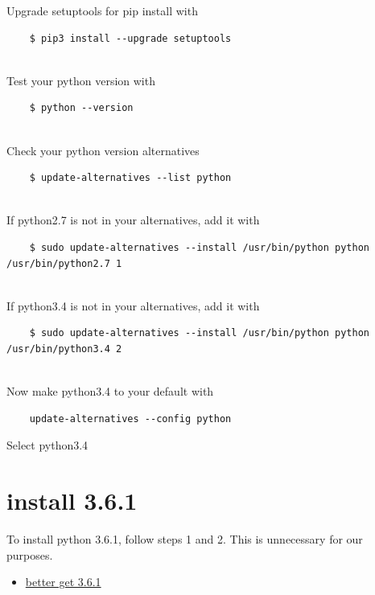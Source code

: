 Upgrade setuptools for pip install with

\begin{verbatim}
    $ pip3 install --upgrade setuptools
    
\end{verbatim}

Test your python version with

\begin{verbatim}
    $ python --version
    
\end{verbatim}

Check your python version alternatives

\begin{verbatim}
    $ update-alternatives --list python
    
\end{verbatim}

If python2.7 is not in your alternatives, add it with

\begin{verbatim}
    $ sudo update-alternatives --install /usr/bin/python python /usr/bin/python2.7 1
    
\end{verbatim}

If python3.4 is not in your alternatives, add it with

\begin{verbatim}
    $ sudo update-alternatives --install /usr/bin/python python /usr/bin/python3.4 2
    
\end{verbatim}

Now make python3.4 to your default with

\begin{verbatim}
    update-alternatives --config python
\end{verbatim}

Select python3.4

\section{install 3.6.1}\label{install-3.6.1}

To install python 3.6.1, follow steps 1 and 2. This is unnecessary for
our purposes.

\begin{itemize}
\tightlist
\item
  \href{https://gist.github.com/dschep/24aa61672a2092246eaca2824400d37f}{better
  get 3.6.1}
\end{itemize}

